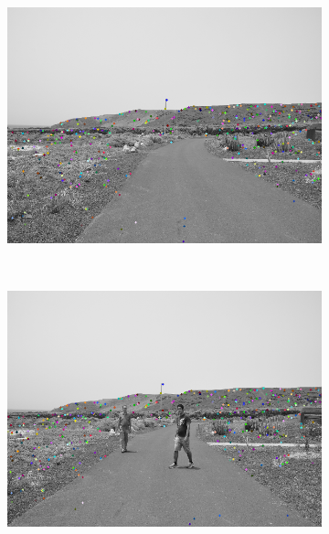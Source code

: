 \begin{figure}[t]
        \centering
        \begin{subfigure}[b]{0.24\columnwidth}
	    \includegraphics[width=\textwidth]{pipeline/fig5}\label{fig:pipelineA_1}
        \end{subfigure}%
        ~
        \begin{subfigure}[b]{0.24\columnwidth}
	    \includegraphics[width=\textwidth]{pipeline/fig4}\label{fig:pipelineA_2}
        \end{subfigure}%
        ~
        \begin{subfigure}[b]{0.24\columnwidth}

\end{subfigure}
\end{figure}
